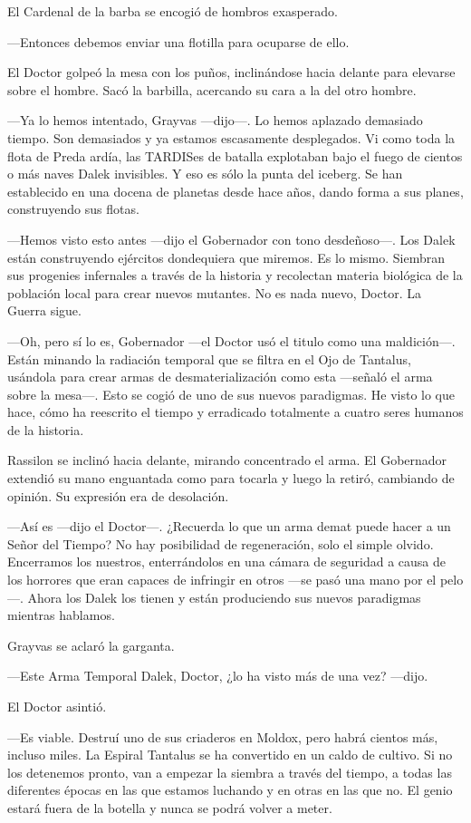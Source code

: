 El Cardenal de la barba se encogió de hombros exasperado. 

—Entonces debemos enviar una flotilla para ocuparse de ello.

El Doctor golpeó la mesa con los puños, inclinándose hacia delante para elevarse sobre el hombre. Sacó la barbilla, acercando su cara a la del otro hombre. 

—Ya lo hemos intentado, Grayvas —dijo—. Lo hemos aplazado demasiado tiempo. Son demasiados y ya estamos escasamente desplegados. Vi como toda la flota de Preda ardía, las TARDISes de batalla explotaban bajo el fuego de cientos o más naves Dalek invisibles. Y eso es sólo la punta del iceberg. Se han establecido en una docena de planetas desde hace años, dando forma a sus planes, construyendo sus flotas.

—Hemos visto esto antes —dijo el Gobernador con tono desdeñoso—. Los Dalek están construyendo ejércitos dondequiera que miremos. Es lo mismo. Siembran sus progenies infernales a través de la historia y recolectan materia biológica de la población local para crear nuevos mutantes. No es nada nuevo, Doctor. La Guerra sigue.

—Oh, pero sí lo es, Gobernador —el Doctor usó el titulo como una maldición—. Están minando la radiación temporal que se filtra en el Ojo de Tantalus, usándola para crear armas de desmaterialización como esta —señaló el arma sobre la mesa—. Esto se cogió de uno de sus nuevos paradigmas. He visto lo que hace, cómo ha reescrito el tiempo y erradicado totalmente a cuatro seres humanos de la historia.

Rassilon se inclinó hacia delante, mirando concentrado el arma. El Gobernador extendió su mano enguantada como para tocarla y luego la retiró, cambiando de opinión. Su expresión era de desolación.

—Así es —dijo el Doctor—. ¿Recuerda lo que un arma demat puede hacer a un Señor del Tiempo? No hay posibilidad de regeneración, solo el simple olvido. Encerramos los nuestros, enterrándolos en una cámara de seguridad a causa de los horrores que eran capaces de infringir en otros —se pasó una mano por el pelo—. Ahora los Dalek los tienen y están produciendo sus nuevos paradigmas mientras hablamos.

Grayvas se aclaró la garganta. 

—Este Arma Temporal Dalek, Doctor, ¿lo ha visto más de una vez? —dijo.

El Doctor asintió. 

—Es viable. Destruí uno de sus criaderos en Moldox, pero habrá cientos más, incluso miles. La Espiral Tantalus se ha convertido en un caldo de cultivo. Si no los detenemos pronto, van a empezar la siembra a través del tiempo, a todas las diferentes épocas en las que estamos luchando y en otras en las que no. El genio estará fuera de la botella y nunca se podrá volver a meter.

